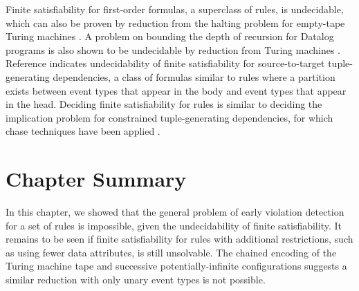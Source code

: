 Finite satisfiability 
for first-order formulas,
a superclass of rules,
is undecidable,
which can also be proven by reduction
from the halting problem for empty-tape Turing machines \cite{libkin2004elements}.
A problem on
bounding the depth of recursion for Datalog programs
is also shown to be undecidable
by reduction from Turing machines \cite{hillebrand1995undecidable}.
Reference \cite{kolaitis2006complexity}
indicates undecidability of finite satisfiability
for source-to-target tuple-generating dependencies,
a class of formulas similar to rules
where a partition exists between event types
that appear in the body and event types 
that appear in the head.
Deciding finite satisfiability for rules is similar to
deciding 
the implication problem
for constrained tuple-generating dependencies,
for which chase techniques have been applied \cite{maher1996chasing, dou2013sound}.

\section{Chapter Summary}
\label{section:finite-satisfiability-conclusion}

In this chapter,
we showed that
the general problem of early violation detection
for a set of rules
is impossible,
given the undecidability of finite satisfiability.
It remains to be seen
if finite satisfiability for rules with additional restrictions,
such as using fewer data attributes,
is still unsolvable.
The chained encoding of the Turing machine tape
and successive potentially-infinite configurations suggests a similar reduction
with only unary event types is not possible.

